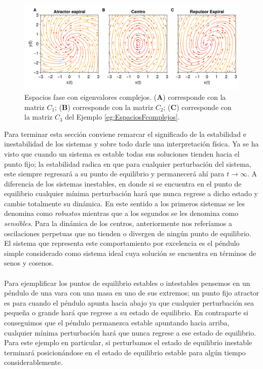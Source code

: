 \begin{ejemplo}
	\begin{figure}[h!]
		\centering
		\includegraphics[scale=0.23]{../Imagenes/Espacios fase complejos}
		\caption{Espacios fase con eigenvalores complejos. (\textbf{A}) corresponde con la matriz $C_1$; (\textbf{B}) corresponde con la matriz $C_2$; (\textbf{C}) corresponde con la matriz $C_3$ del Ejemplo \ref{eg:EspaciosFcomplejos}.}
		\label{fig:EFComplejos}
	\end{figure}
\end{ejemplo}
Para terminar esta sección conviene remarcar el significado de la estabilidad e inestabilidad de los sistemas y sobre todo darle una interpretación física. Ya se ha visto que cuando un sistema es estable todas sus soluciones tienden hacia el punto fijo; la estabilidad radica en que para cualquier perturbación del sistema, este siempre regresará a su punto de equilibrio y permanecerá ahí para $t\to\infty$. A diferencia de los sistemas inestables, en donde si se encuentra en el punto de equilibrio cualquier mínima perturbación hará que nunca regrese a dicho estado y cambie totalmente su dinámica. En este sentido a los primeros sistemas se les denomina como \textit{robustos} mientras que a los segundos se les denomina como \textit{sensibles}. Para la dinámica de los centros, anteriormente nos referíamos a oscilaciones perpetuas que no tienden o divergen de ningún punto de equilibrio. El sistema que representa este comportamiento por excelencia es el péndulo simple considerado como sistema ideal cuya solución se encuentra en términos de senos y cosenos. \\
\\
Para ejemplificar los puntos de equilibrio estables o intestables pensemos en un péndulo de una vara con una masa en uno de sus extremos; un punto fijo atractor es para cuando el péndulo apunta hacia abajo ya que cualquier perturbación sea pequeña o grande hará que regrese a su estado de equilibrio. En contraparte si conseguimos que el péndulo permanezca estable apuntando hacia arriba, cualquier mínima perturbación hará que nunca regrese a ese estado de equilibrio. Para este ejemplo en particular, si perturbamos el estado de equilibrio inestable terminará posicionándose en el estado de equilibrio estable para algún tiempo considerablemente.


